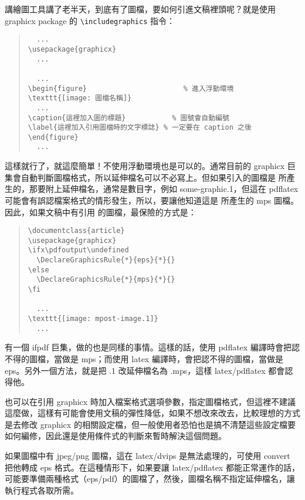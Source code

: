 講繪圖工具講了老半天，到底有了圖檔，要如何引進文稿裡頭呢？就是使用 {\sffamily graphicx} package 的 \verb|\includegraphics| 指令：

\begin{quote}
  \begin{verbatim}
  ...
\usepackage{graphicx}
  ...

  ...
\begin{figure}                       % 進入浮動環境
\texttt{[image: 圖檔名稱]}
  ...
\caption{這裡加入圖的標題}           % 圖號會自動編號
\label{這裡加入引用圖檔時的文字標誌} % 一定要在 caption 之後
\end{figure}
  ...
\end{verbatim}
\end{quote}

這樣就行了，就這麼簡單！不使用浮動環境也是可以的。通常目前的 {\sffamily graphicx} 巨集會自動判斷圖檔格式，所以延伸檔名可以不必寫上。但如果引入的圖檔是 \MP{} 所產生的，那要附上延伸檔名，通常是數目字，例如 {\ttfamily some-graphic.1}，但這在 {\ttfamily pdflatex} 可能會有誤認檔案格式的情形發生，所以，要讓他知道這是 \MP{} 所產生的 mps 圖檔。因此，如果文稿中有引用 \MP{} 的圖檔，最保險的方式是：

\begin{quote}
  \begin{verbatim}
\documentclass{article}
\usepackage{graphicx}
\ifx\pdfoutput\undefined
  \DeclareGraphicsRule{*}{eps}{*}{}
\else
  \DeclareGraphicsRule{*}{mps}{*}{}
\fi

  ...
\texttt{[image: mpost-image.1]}
  ...

\end{verbatim}
\end{quote}

有一個 {\sffamily ifpdf} 巨集，做的也是同樣的事情。這樣的話，使用 {\ttfamily pdflatex} 編譯時會把認不得的圖檔，當做是 mps；而使用 {\ttfamily latex} 編譯時，會把認不得的圖檔，當做是 eps。另外一個方法，就是把 {\ttfamily *.1} 改延伸檔名為 {\ttfamily *.mps}，這樣 {\ttfamily latex/pdflatex} 都會認得他。

也可以在引用 {\sffamily graphicx} 時加入檔案格式選項參數，指定圖檔格式，但這裡不建議這麼做，這樣有可能會使用文稿的彈性降低，如果不想改來改去，比較理想的方式是去修改 {\sffamily graphicx} 的相關設定檔，但一般使用者恐怕也是搞不清楚這些設定檔要如何編修，因此還是使用條件式的判斷來暫時解決這個問題。

如果圖檔中有 jpeg/png 圖檔，這在 {\ttfamily latex/dvips} 是無法處理的，可使用 {\ttfamily convert} 把他轉成 eps 格式。在這種情形下，如果要讓 {\ttfamily latex/pdflatex} 都能正常運作的話，可能要準備兩種格式（eps/pdf）的圖檔了，然後，圖檔名稱不指定延伸檔名，讓執行程式各取所需。

